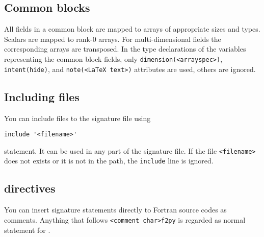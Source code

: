 \subsection{Common blocks}
\label{sec:commonblocks}

All fields in a common block are mapped to arrays of appropriate sizes
and types. Scalars are mapped to rank-0 arrays. For multi-dimensional
fields the corresponding arrays are transposed. In the type
declarations of the variables representing the common block fields,
only \texttt{dimension(<arrayspec>)}, \texttt{intent(hide)}, and
\texttt{note(<LaTeX text>)} attributes are used, others are ignored.

\subsection{Including files}
\label{sec:include}

You can include files to the signature file using
\begin{verbatim}
include '<filename>'
\end{verbatim}
statement. It can be used in any part of the signature file.
If the file \texttt{<filename>} does not exists or it is not in the path,
the \texttt{include} line is ignored. 

\subsection{\fpy directives}
\label{sec:directives}

You can insert signature statements directly to Fortran source codes
as comments. Anything that follows \texttt{<comment char>f2py} is
regarded as normal statement for \fpy.


